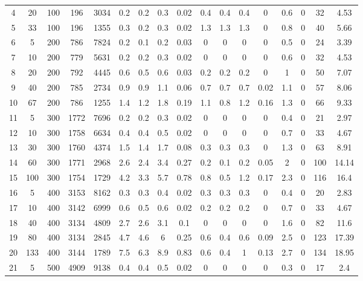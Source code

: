 \documentclass[11pt]{article}
\newcommand{\np}{\newpage}
\begin{document}
\begin{landscape}
\begin{longtable}[c]{ccccc|cccc|cccc|cccc}
		4 & 20 & 100 & 196 & 3034 & 0.2 & 0.2 & 0.3 & 0.02 & 0.4 & 0.4 & 0.4 & 0 & 0.6 & 0 & 32 & 4.53 \\
		\rowcolor[HTML]{EFEFEF} 
		5 & 33 & 100 & 196 & 1355 & 0.3 & 0.2 & 0.3 & 0.02 & 1.3 & 1.3 & 1.3 & 0 & 0.8 & 0 & 40 & 5.66 \\
		6 & 5 & 200 & 786 & 7824 & 0.2 & 0.1 & 0.2 & 0.03 & 0 & 0 & 0 & 0 & 0.5 & 0 & 24 & 3.39 \\
		7 & 10 & 200 & 779 & 5631 & 0.2 & 0.2 & 0.3 & 0.02 & 0 & 0 & 0 & 0 & 0.6 & 0 & 32 & 4.53 \\
		8 & 20 & 200 & 792 & 4445 & 0.6 & 0.5 & 0.6 & 0.03 & 0.2 & 0.2 & 0.2 & 0 & 1 & 0 & 50 & 7.07 \\
		9 & 40 & 200 & 785 & 2734 & 0.9 & 0.9 & 1.1 & 0.06 & 0.7 & 0.7 & 0.7 & 0.02 & 1.1 & 0 & 57 & 8.06 \\
		10 & 67 & 200 & 786 & 1255 & 1.4 & 1.2 & 1.8 & 0.19 & 1.1 & 0.8 & 1.2 & 0.16 & 1.3 & 0 & 66 & 9.33 \\
		\rowcolor[HTML]{EFEFEF} 
		11 & 5 & 300 & 1772 & 7696 & 0.2 & 0.2 & 0.3 & 0.02 & 0 & 0 & 0 & 0 & 0.4 & 0 & 21 & 2.97 \\
		\rowcolor[HTML]{EFEFEF} 
		12 & 10 & 300 & 1758 & 6634 & 0.4 & 0.4 & 0.5 & 0.02 & 0 & 0 & 0 & 0 & 0.7 & 0 & 33 & 4.67 \\
		\rowcolor[HTML]{EFEFEF} 
		13 & 30 & 300 & 1760 & 4374 & 1.5 & 1.4 & 1.7 & 0.08 & 0.3 & 0.3 & 0.3 & 0 & 1.3 & 0 & 63 & 8.91 \\
		\rowcolor[HTML]{EFEFEF} 
		14 & 60 & 300 & 1771 & 2968 & 2.6 & 2.4 & 3.4 & 0.27 & 0.2 & 0.1 & 0.2 & 0.05 & 2 & 0 & 100 & 14.14 \\
		\rowcolor[HTML]{EFEFEF} 
		15 & 100 & 300 & 1754 & 1729 & 4.2 & 3.3 & 5.7 & 0.78 & 0.8 & 0.5 & 1.2 & 0.17 & 2.3 & 0 & 116 & 16.4 \\
		16 & 5 & 400 & 3153 & 8162 & 0.3 & 0.3 & 0.4 & 0.02 & 0.3 & 0.3 & 0.3 & 0 & 0.4 & 0 & 20 & 2.83 \\
		17 & 10 & 400 & 3142 & 6999 & 0.6 & 0.5 & 0.6 & 0.02 & 0.2 & 0.2 & 0.2 & 0 & 0.7 & 0 & 33 & 4.67 \\
		18 & 40 & 400 & 3134 & 4809 & 2.7 & 2.6 & 3.1 & 0.1 & 0 & 0 & 0 & 0 & 1.6 & 0 & 82 & 11.6 \\
		19 & 80 & 400 & 3134 & 2845 & 4.7 & 4.6 & 6 & 0.25 & 0.6 & 0.4 & 0.6 & 0.09 & 2.5 & 0 & 123 & 17.39 \\
		20 & 133 & 400 & 3144 & 1789 & 7.5 & 6.3 & 8.9 & 0.83 & 0.6 & 0.4 & 1 & 0.13 & 2.7 & 0 & 134 & 18.95 \\ \np
		\rowcolor[HTML]{EFEFEF} 
		21 & 5 & 500 & 4909 & 9138 & 0.4 & 0.4 & 0.5 & 0.02 & 0 & 0 & 0 & 0 & 0.3 & 0 & 17 & 2.4 \\

\end{longtable}
\end{landscape}
\end{document}
